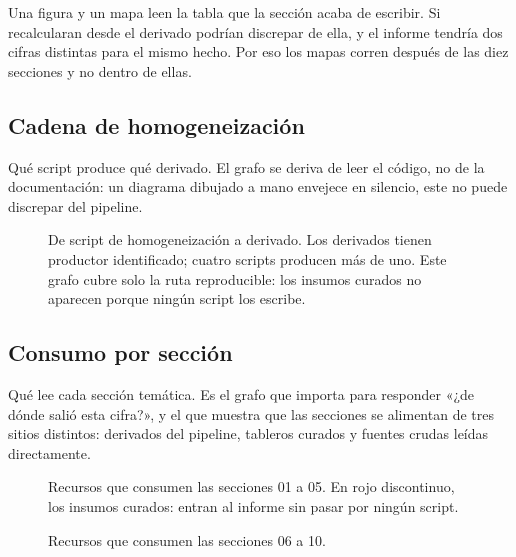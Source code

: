 \documentclass[11pt,a4paper]{article}
\begin{document}
\begin{regla}[title={Regla 1 — la figura no recalcula}]
Una figura y un mapa leen la tabla que la sección acaba de escribir. Si
recalcularan desde el derivado podrían discrepar de ella, y el informe tendría
dos cifras distintas para el mismo hecho. Por eso los mapas corren después de
las diez secciones y no dentro de ellas.
\end{regla}

\subsection{Cadena de homogeneización}

Qué script produce qué derivado. El grafo se deriva de leer el código, no de la
documentación: un diagrama dibujado a mano envejece en silencio, este no puede
discrepar del pipeline.

\begin{figure}[htbp]\centering

\caption{De script de homogeneización a derivado. Los
\cifraDerivados{} derivados tienen productor identificado; cuatro scripts
producen más de uno. Este grafo cubre solo la ruta reproducible: los insumos
curados no aparecen porque ningún script los escribe.}
\end{figure}

\subsection{Consumo por sección}

Qué lee cada sección temática. Es el grafo que importa para responder «¿de dónde
salió esta cifra?», y el que muestra que las secciones se alimentan de tres
sitios distintos: derivados del pipeline, tableros curados y fuentes crudas
leídas directamente.

\begin{figure}[p]\centering

\caption{Recursos que consumen las secciones 01 a 05. En rojo discontinuo, los
insumos curados: entran al informe sin pasar por ningún script.}
\end{figure}

\begin{figure}[p]\centering

\caption{Recursos que consumen las secciones 06 a 10.}
\end{figure}

\clearpage

\end{document}
